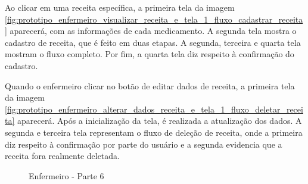 Ao clicar em uma receita específica, a primeira tela da imagem \ref{fig:prototipo_enfermeiro_visualizar_receita_e_tela_1_fluxo_cadastrar_receita} aparecerá, com as informações de cada medicamento. A segunda tela mostra o cadastro de receita, que é feito em duas etapas. A segunda, terceira e quarta tela mostram o fluxo completo. Por fim, a quarta tela diz respeito à confirmação do cadastro.

Quando o enfermeiro clicar no botão de editar dados de receita, a primeira tela da imagem \ref{fig:prototipo_enfermeiro_alterar_dados_receita_e_tela_1_fluxo_deletar_receita} aparecerá. Após a inicialização da tela, é realizada a atualização dos dados. A segunda e terceira tela representam o fluxo de deleção de receita, onde a primeira diz respeito à confirmação por parte do usuário e a segunda evidencia que a receita fora realmente deletada.

\begin{figure}[H]
    \centering
\end{figure}
    
\begin{figure}[H]
    \centering    
    \caption{Enfermeiro - Parte 6}
\end{figure}



